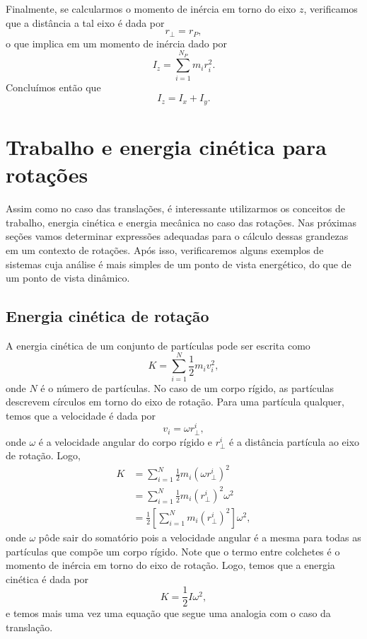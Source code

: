 Finalmente, se calcularmos o momento de inércia em torno do eixo $z$, verificamos que a distância a tal eixo é dada por
\begin{equation}
    r_\perp = r_P,
\end{equation}
%
o que implica em um momento de inércia dado por
\begin{equation}
    I_z = \sum_{i = 1}^{N_P} m_i r_i^2.
\end{equation}
%
Concluímos então que
\begin{equation}
    I_z = I_x + I_y.
\end{equation}

\section{Trabalho e energia cinética para rotações}

Assim como no caso das translações, é interessante utilizarmos os conceitos de trabalho, energia cinética e energia mecânica no caso das rotações. Nas próximas seções vamos determinar expressões adequadas para o cálculo dessas grandezas em um contexto de rotações. Após isso, verificaremos alguns exemplos de sistemas cuja análise é mais simples de um ponto de vista energético, do que de um ponto de vista dinâmico.

\subsection{Energia cinética de rotação}

A energia cinética de um conjunto de partículas pode ser escrita como
\begin{equation}
	K = \sum_{i=1}^N \frac{1}{2} m_i v_i^2,
\end{equation}
%
onde $N$ é o número de partículas. No caso de um corpo rígido, as partículas descrevem círculos em torno do eixo de rotação. Para uma partícula qualquer, temos que a velocidade é dada por
\begin{equation}
    v_i = \omega r_\perp^i,
\end{equation}
%
onde $\omega$ é a velocidade angular do corpo rígido e $r_\perp^i$ é a distância  partícula ao eixo de rotação. Logo,
\begin{align}
	K &= \sum_{i=1}^{N} \frac{1}{2} m_i (\omega r_\perp^i)^2 \\
	&= \sum_{i=1}^N \frac{1}{2} m_i (r_\perp^i)^2 \omega^2 \\
	&= \frac{1}{2} \left[\sum_{i=1}^N m_i (r_\perp^i)^2\right] \omega^2,
\end{align}
%
onde $\omega$ pôde sair do somatório pois a velocidade angular é a mesma para todas as partículas que compõe um corpo rígido. Note que o termo entre colchetes é o momento de inércia em torno do eixo de rotação. Logo, temos que a energia cinética é dada por
\begin{equation}
	K = \frac{1}{2} I \omega^2,
\end{equation}
%
e temos mais uma vez uma equação que segue uma analogia com o caso da translação.

